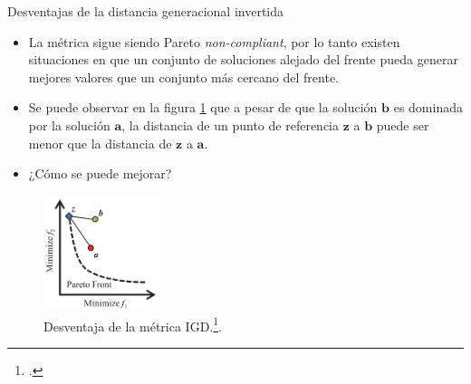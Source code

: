\documentclass{beamer}
\begin{document}
\begin{frame}{Desventajas de la distancia generacional invertida}
\begin{itemize}
\justifying
\scriptsize
\item La métrica sigue siendo Pareto \textit{non-compliant}, por lo tanto existen situaciones en que un conjunto de soluciones alejado del frente pueda generar mejores valores que un conjunto más cercano del frente.
\item Se puede observar en la figura \ref{fig:igd_fail} que a pesar de que la solución $\boldsymbol{b}$ es dominada por la solución $\boldsymbol{a}$, la distancia de un punto de referencia $\boldsymbol{z}$ a $\boldsymbol{b}$ puede ser menor que la distancia de $\boldsymbol{z}$ a $\boldsymbol{a}$.
\item ¿Cómo se puede mejorar?
\end{itemize}
\begin{figure}[H]
\centering
\includegraphics[width=0.3\textwidth]{igd_2.png}
\caption{\scriptsize Desventaja de la métrica IGD.\footcite{ishibuchi2016sensitivity}.} \label{fig:igd_fail}
\end{figure}
\end{frame}
\end{document}
